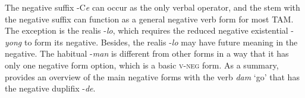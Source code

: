 \documentclass[output=paper,colorlinks,citecolor=brown]{langscibook}
\begin{document}
\begin{table}
    \caption{Summary of the negation strategies in Amri Karbi  }
    \label{tab:amr:new}
\end{table}


The negative suffix -C\textit{e} can occur as the only verbal operator, and the stem with the negative suffix can function as a general negative verb form for most TAM. The exception is the realis -\textit{lo}, which requires the reduced negative existential -\textit{yong} to form its negative. Besides, the realis -\textit{lo} may have future meaning in the negative. The habitual -\textit{man} is different from other forms in a way that it has only one negative form option, which is a basic \textsc{v}{}-\textsc{neg} form.
As a summary,  provides an overview of the main negative forms with the verb \textit{dam} ‘go’ that has the negative duplifix {}-\textit{de}. 
\end{document}
